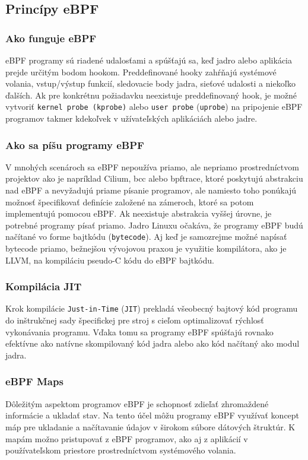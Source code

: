 \subsection{Princípy eBPF}
\subsubsection{Ako funguje eBPF} 
eBPF programy sú riadené udalosťami a spúšťajú sa, keď jadro alebo aplikácia prejde určitým bodom hookom. Preddefinované hooky zahŕňajú systémové volania, vstup/výstup funkcií, sledovacie body jadra, sieťové udalosti a niekoľko ďalších.
Ak pre konkrétnu požiadavku neexistuje preddefinovaný hook, je možné vytvoriť \texttt{kernel probe (\texttt{kprobe})} alebo \texttt{user probe} (\texttt{uprobe}) na pripojenie eBPF programov takmer kdekoľvek v užívateľských aplikáciách alebo jadre.

\subsubsection{Ako sa píšu programy eBPF}
V mnohých scenároch sa eBPF nepoužíva priamo, ale nepriamo prostredníctvom projektov ako je napríklad Cilium, bcc alebo bpftrace, ktoré poskytujú abstrakciu nad eBPF a nevyžadujú priame písanie programov, ale namiesto toho ponúkajú možnosť špecifikovať definície založené na zámeroch, ktoré sa potom implementujú pomocou eBPF.
Ak neexistuje abstrakcia vyššej úrovne, je potrebné programy písať priamo. Jadro Linuxu očakáva, že programy eBPF budú načítané vo forme bajtkódu (\texttt{bytecode}). Aj keď je samozrejme možné napísať bytecode priamo, bežnejšou vývojovou praxou je využitie kompilátora, ako je LLVM, na kompiláciu pseudo-C kódu do eBPF bajtkódu.

\subsubsection{Kompilácia JIT}
Krok kompilácie \texttt{Just-in-Time} (\texttt{JIT}) prekladá všeobecný bajtový kód programu do inštrukčnej sady špecifickej pre stroj s cieľom optimalizovať rýchlosť vykonávania programu. Vďaka tomu sa programy eBPF spúšťajú rovnako efektívne ako natívne skompilovaný kód jadra alebo ako kód načítaný ako modul jadra.

\subsubsection{eBPF Maps}
Dôležitým aspektom programov eBPF je schopnosť zdieľať zhromaždené informácie a ukladať stav. Na tento účel môžu programy eBPF využívať koncept máp pre ukladanie a načítavanie údajov v širokom súbore dátových štruktúr. K mapám možno pristupovať z eBPF programov, ako aj z aplikácií v používateľskom priestore prostredníctvom systémového volania.

